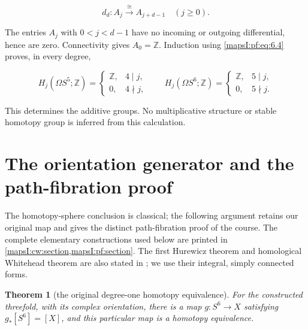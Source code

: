 \documentclass[11pt]{article}
\newtheorem{theorem}{Theorem}[section]
\begin{document}
\begin{equation}
d_d:A_j\xrightarrow{\ \cong\ }A_{j+d-1}\quad(j\geq0).
\label{mapsI:pf:eq:6.4}
\end{equation}

The entries \(A_j\) with \(0<j<d-1\) have no incoming or outgoing differential, hence are zero. Connectivity gives \(A_0=\mathbb Z\). Induction using \eqref{mapsI:pf:eq:6.4} proves, in every degree,

\begin{equation}
H_j(\Omega S^5;\mathbb Z)=
\begin{cases}\mathbb Z,&4\mid j,\\0,&4\nmid j,\end{cases}
\qquad
H_j(\Omega S^6;\mathbb Z)=
\begin{cases}\mathbb Z,&5\mid j,\\0,&5\nmid j.\end{cases}
\label{mapsI:pf:eq:6.5}
\end{equation}

This determines the additive groups. No multiplicative structure or stable homotopy group is inferred from this calculation.

\section{The orientation generator and the path-fibration proof}
\label{mapsI:course:homotopy-section}

The homotopy-sphere conclusion is classical; the following argument retains
our original map and gives the distinct path-fibration proof of the course.
The complete elementary constructions used below are printed in
\cref{mapsI:cw:section,mapsI:pf:section}.  The first Hurewicz theorem and
homological Whitehead theorem are also stated in
\cite[Theorem~4.32 and Corollary~4.33]{Hatcher2002}; we use their integral,
simply connected forms.

\begin{theorem}[the original degree-one homotopy equivalence]
\label{mapsI:course:CG-S6-07-HOMOTOPY}
For the constructed threefold, with its complex orientation, there is a
map \(g:S^6\to X\) satisfying \(g_*[S^6]=[X]\), and this particular map
is a homotopy equivalence.
\end{theorem}
\end{document}
